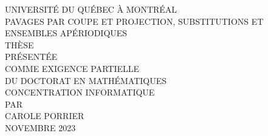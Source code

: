 \begin{titlepage}
\begin{singlespace}
\centering
\large 
	\vspace{0.4cm}
	UNIVERSITÉ DU QUÉBEC À MONTRÉAL\\
        \vspace{3cm}
\Large 
	PAVAGES PAR COUPE ET PROJECTION, SUBSTITUTIONS ET ENSEMBLES APÉRIODIQUES\\
        \vspace{3cm}
\large 
        THÈSE\\
	\vspace{0.4cm}
	PRÉSENTÉE\\
	\vspace{0.4cm}
	COMME EXIGENCE PARTIELLE\\
	\vspace{0.4cm}
	DU DOCTORAT EN MATHÉMATIQUES\\
	\vspace{0.4cm}
        CONCENTRATION INFORMATIQUE\\
        \vspace{3cm}
	PAR\\
	\vspace{0.4cm}
\Large 
        CAROLE PORRIER\\
        \vspace{3cm}
        NOVEMBRE 2023 %

\end{singlespace}
\end{titlepage}
